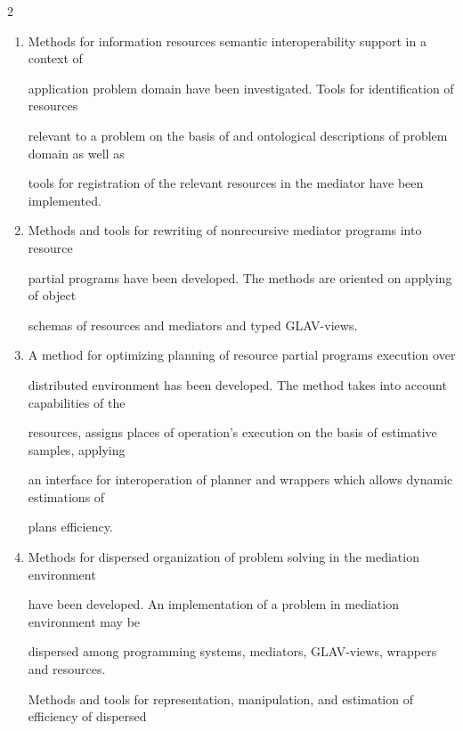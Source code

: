\begin{multicols}{2}



\begin{enumerate}[1.]

\addtocounter{enumi}{2}

\item Methods for information resources semantic interoperability support in a context of 

application problem domain have been investigated. Tools for identification of resources 

relevant to a problem on the basis of and ontological descriptions of problem domain as well as 

tools for registration of the relevant resources in the mediator have been implemented.\\[-9pt]

\item Methods and tools for rewriting of nonrecursive mediator programs into resource 

partial programs have been developed. The methods are oriented on applying of object 

schemas of resources and mediators and typed GLAV-views.\\[-9pt]

\item A method for optimizing planning of resource partial programs execution over 

distributed environment has been developed. The method takes into account capabilities of the 

resources, assigns places of operation's execution on the basis of estimative samples, applying 

an interface for interoperation of planner and wrappers which allows dynamic estimations of 

plans efficiency.\\[-10pt]

\item Methods for dispersed organization of problem solving in the mediation environment 

have been developed. An implementation of a problem in mediation environment may be 

dispersed among programming systems, mediators, GLAV-views, wrappers and resources. 

Methods and tools for representation, manipulation, and estimation of efficiency of dispersed 


\end{enumerate}
\end{multicols}
